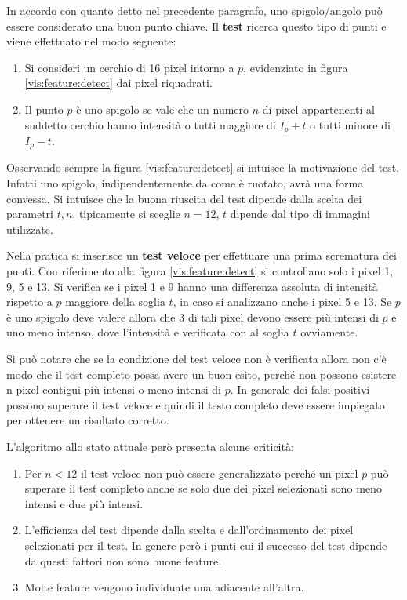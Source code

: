  
In accordo con quanto detto nel precedente paragrafo, uno spigolo/angolo può essere considerato una buon punto chiave. Il \textbf{test} ricerca questo tipo di punti e viene effettuato nel modo seguente:
\begin{enumerate}
	\item Si consideri un cerchio di 16 pixel intorno a $p$, evidenziato in figura \ref{vis:feature:detect} dai pixel riquadrati.
	\item Il punto $p$ è uno spigolo se vale che un numero $n$ di pixel appartenenti al suddetto cerchio hanno intensità o tutti maggiore di $I_p + t$ o tutti minore di $I_p - t$.
\end{enumerate}

Osservando sempre la figura \ref{vis:feature:detect} si intuisce la motivazione del test. Infatti uno spigolo, indipendentemente da come è ruotato, avrà una forma convessa. Si intuisce che la buona riuscita del test dipende dalla scelta dei parametri $t, n$, tipicamente si sceglie $n = 12$, $t$ dipende dal tipo di immagini utilizzate.

	Nella pratica si inserisce un \textbf{test veloce} per effettuare una prima scrematura dei punti. Con riferimento alla figura \ref{vis:feature:detect} si controllano solo i pixel 1, 9, 5 e 13. Si verifica se i pixel 1 e 9 hanno una differenza assoluta di intensità rispetto a $p$ maggiore della soglia $t$, in caso si analizzano anche i pixel 5 e 13. Se $p$ è uno spigolo deve valere allora che 3 di tali pixel devono essere più intensi di $p$ e uno meno intenso, dove l'intensità e verificata con al soglia $t$ ovviamente.

Si può notare che se la condizione del test veloce non è verificata allora non c'è modo che il test completo possa avere un buon esito, perché non possono esistere n pixel contigui più intensi o meno intensi di $p$. In generale dei falsi positivi possono superare il test veloce e quindi il testo completo deve essere impiegato per ottenere un risultato corretto.

L'algoritmo allo stato attuale però presenta alcune criticità:
\begin{enumerate}
	\item Per $n < 12$ il test veloce non può essere generalizzato perché un pixel $p$ può superare il test completo anche se solo due dei pixel selezionati sono meno intensi e due più intensi.
	\item L'efficienza del test dipende dalla scelta e dall'ordinamento dei pixel selezionati per il test. In genere però i punti cui il successo del test dipende da questi fattori non sono buone feature. 
	\item Molte feature vengono individuate una adiacente all'altra.
\end{enumerate} 

